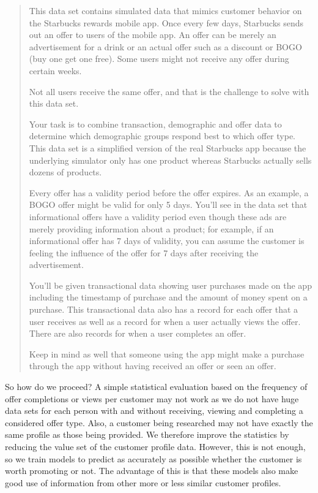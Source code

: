 \documentclass[11pt]{article} %
\begin{document}
\begin{quote}
\begin{em}
This data set contains simulated data that mimics customer behavior on the Starbucks rewards mobile app. Once every few days, Starbucks sends out an offer to users of the mobile app. An offer can be merely an advertisement for a drink or an actual offer such as a discount or BOGO (buy one get one free). Some users might not receive any offer during certain weeks. 

Not all users receive the same offer, and that is the challenge to solve with this data set.

Your task is to combine transaction, demographic and offer data to determine which demographic groups respond best to which offer type. This data set is a simplified version of the real Starbucks app because the underlying simulator only has one product whereas Starbucks actually sells dozens of products.

Every offer has a validity period before the offer expires. As an example, a BOGO offer might be valid for only 5 days. You'll see in the data set that informational offers have a validity period even though these ads are merely providing information about a product; for example, if an informational offer has 7 days of validity, you can assume the customer is feeling the influence of the offer for 7 days after receiving the advertisement.

You'll be given transactional data showing user purchases made on the app including the timestamp of purchase and the amount of money spent on a purchase. This transactional data also has a record for each offer that a user receives as well as a record for when a user actually views the offer. There are also records for when a user completes an offer. 

Keep in mind as well that someone using the app might make a purchase through the app without having received an offer or seen an offer.
\end{em}
\end{quote}

So how do we proceed?
A simple statistical evaluation based on the frequency of offer completions or views per customer may not work as we do not have huge data sets for each person with and without receiving, viewing and completing a considered offer type. Also, a customer being researched may not have exactly the same profile as those being provided.
We therefore improve the statistics by reducing the value set of the customer profile data.
However, this is not enough, so we train models to predict as accurately as possible whether the customer is worth promoting or not.
The advantage of this is that these models also make good use of information from other more or less similar customer profiles.
\end{document}
